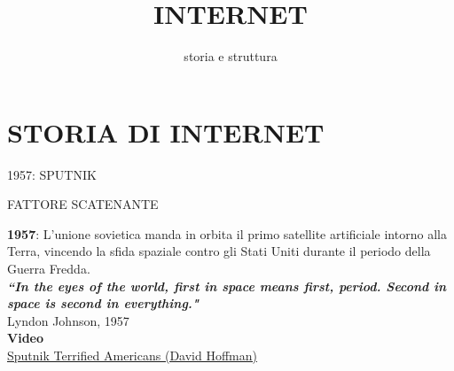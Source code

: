 \documentclass[aspectratio=1610]{beamer}
\title{INTERNET}
\subtitle{storia e struttura}
\date{}
\institute{\textit{
        Fonti:
        \begin{itemize}
            \item[-] \href{https://www.isoc.it/storia-di-internet}{Internet Society}
            \item[-] \href{https://www.fastweb.it/fastweb-plus/digital-magazine/storia-del-progetto-arpanet/}{Fastweb Plus}
            \item[-] \href{https://www.wired.it/internet/web/2019/03/11/internet-world-wide-web-storia/}{Wired}
            \item[-] \href{https://www.mozilla.org/it/firefox/browsers/browser-history/}{Mozilla}
        \end{itemize}
    }
}
\begin{document}
\begin{frame}
    \titlepage
\end{frame}

\section{STORIA DI INTERNET}

\begin{frame}{1957: SPUTNIK}
    \begin{alertblock}{FATTORE SCATENANTE}
        \begin{minipage}{0.98\linewidth}
            \justifying
            \textbf{1957}: L'unione sovietica manda in orbita il primo satellite artificiale intorno alla Terra, vincendo la 
            sfida spaziale contro gli Stati Uniti durante il periodo della Guerra Fredda.\\
            \textbf{\textit{``In the eyes of the world, first in space means first, period. Second in space is 
            second in everything."}}\\
            Lyndon Johnson, 1957\\
            \bigskip
            \tiny{\textbf{Video}}\\
            \tiny{\href{https://www.youtube.com/watch?v=xSQpBUkwyPo}{Sputnik Terrified Americans (David Hoffman)}}
        \end{minipage}
    \end{alertblock}
\end{frame}
\end{document}
